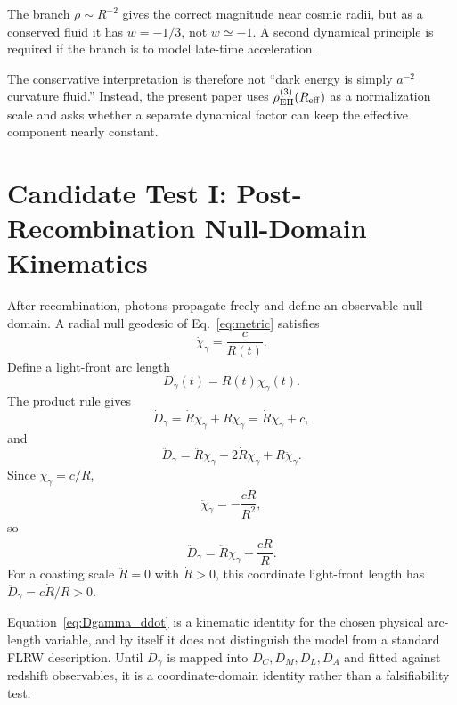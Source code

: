 \documentclass[11pt,a4paper]{article}
\newcommand{\Reff}{R_{\rm eff}}
\begin{document}
\begin{resultbox}
The branch $\rho\sim R^{-2}$ gives the correct magnitude near cosmic radii, but
as a conserved fluid it has $w=-1/3$, not $w\simeq-1$.  A second dynamical
principle is required if the branch is to model late-time acceleration.
\end{resultbox}

The conservative interpretation is therefore not
``dark energy is simply $a^{-2}$ curvature fluid.''  Instead, the present paper
uses $\rho_{\rm EH}^{(3)}(\Reff)$ as a normalization scale and asks whether a
separate dynamical factor can keep the effective component nearly constant.

\section{Candidate Test I: Post-Recombination Null-Domain Kinematics}
\label{sec:nulldom}

After recombination, photons propagate freely and define an observable null
domain.  A radial null geodesic of Eq.~\eqref{eq:metric} satisfies
\begin{equation}
\dot\chi_\gamma=\frac{c}{R(t)}.
\label{eq:chidot}
\end{equation}
Define a light-front arc length
\begin{equation}
D_\gamma(t)=R(t)\chi_\gamma(t).
\label{eq:Dgamma}
\end{equation}
The product rule gives
\begin{equation}
\dot D_\gamma=\dot R\chi_\gamma+R\dot\chi_\gamma
=\dot R\chi_\gamma+c,
\label{eq:Dgamma_dot}
\end{equation}
and
\begin{equation}
\ddot D_\gamma
=\ddot R\chi_\gamma+2\dot R\dot\chi_\gamma+R\ddot\chi_\gamma.
\end{equation}
Since $\dot\chi_\gamma=c/R$,
\begin{equation}
\ddot\chi_\gamma=-\frac{c\dot R}{R^2},
\end{equation}
so
\begin{equation}
\boxed{\ddot D_\gamma=\ddot R\chi_\gamma+\frac{c\dot R}{R}.}
\label{eq:Dgamma_ddot}
\end{equation}
For a coasting scale $\ddot R=0$ with $\dot R>0$, this coordinate light-front
length has $\ddot D_\gamma=c\dot R/R>0$.

\begin{caveatbox}
Equation~\eqref{eq:Dgamma_ddot} is a kinematic identity for the chosen physical
arc-length variable, and by itself it does not distinguish the model from a
standard FLRW description.  Until $D_\gamma$ is mapped into $D_C,D_M,D_L,D_A$
and fitted against redshift observables, it is a coordinate-domain identity
rather than a falsifiability test.
\end{caveatbox}
\end{document}
